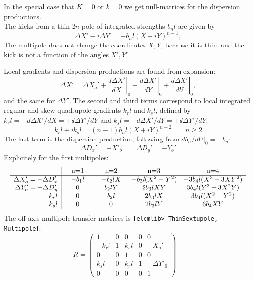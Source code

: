 \documentclass[12pt]{article}
\newcommand\beq{\begin{equation}}
\newcommand\eeq{\end{equation}}
\newcommand\code[1]{{\tt [#1]}}
\begin{document}
In the special case that $K=0$ or $k=0$ we get null-matrices for the dispersion productions.\\


The kicks from a thin $2n$-pole of integrated strengths $b_nl$ are given by
\beq
\Delta X' - i \Delta Y ' = - b_nl (X+iY)^{n-1},
\eeq
The multipole does not change the coordinates $X,Y$, because it is thin, and the kick is not a function of the angles $X',Y'$.

Local gradients and dispersion productions are found from expansion:
\[
\Delta X' = \Delta X_o' + \left. \frac{d\Delta X'}{dX}\right|_{0} + \left. \frac{d\Delta X'}{dY}\right|_{0}
+ \left. \frac{d\Delta X'}{dU}\right|_{0},
\]
and the same for $\Delta Y'$. The second and third terms correspond to local integrated regular and skew quadrupole gradients $k_rl$ and $k_sl$, defined by $k_rl=-d\Delta X'/dX=+d\Delta Y'/dY$ and $k_sl=+d\Delta X'/dY=+d\Delta Y'/dY$:
\beq
k_rl + i k_sl = (n-1) b_nl  (X+iY)^{n-2}\qquad n\geq 2
\eeq
The last term is the dispersion production, following from $db_n/dU|_0=-b_n$:
\beq
\Delta D_x'= - X'_o\qquad \Delta D_y'=-Y_o'
\eeq
Explicitely for the first multipoles:
\beq\label{eq:mpole}
\begin{array}{r|cccc}
& \quad $n=1$ \quad & \quad $n=2$ \quad & \quad $n=3$ \quad & \quad $n=4$ \quad  \\
\hline
\Delta X'_o = -\Delta D_x' & -b_1l &  - b_2l X & -b_3l (X^2-Y^2) & -3b_4l (X^3-3XY^2) \\
\Delta Y'_o= -\Delta D_y'  &     0 &    b_2l Y &  2 b_3l X Y  &  3 b_4l (Y^3-3X^2Y) \\
k_rl  & 0 & b_2l &  2 b_3l X & 3 b_4l (X^2-Y^2) \\
k_sl  & 0 & 0    &  2 b_3l Y & 6 b_4 XY \\
\end{array}
\eeq
The off-axis multipole transfer matrices is \code{elemlib> ThinSextupole, Multipole}:
\beq
R = \left(\begin{array}{ccccc} 1 & 0 & 0 & 0 & 0 \\
                             - k_rl & 1 & k_sl & 0 & -X_o' \\
                               0 & 0 & 1 & 0 & 0 \\
                               k_sl & 0 & k_rl & 1 & -\Delta Y'_0 \\
                               0 & 0 & 0 & 0 & 1
\end{array}\right) \quad
\eeq
\end{document}
